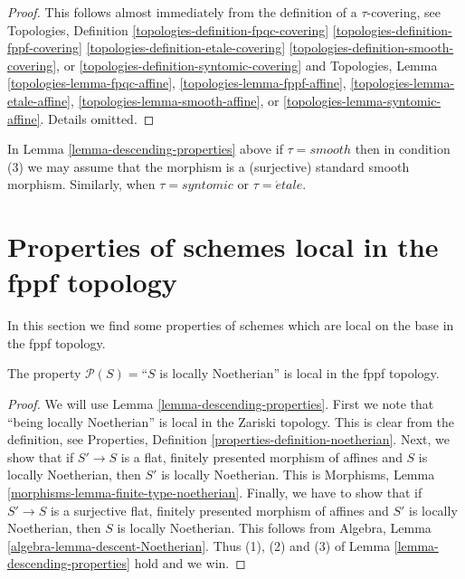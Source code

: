 \begin{proof}
This follows almost immediately from the definition of
a $\tau$-covering, see
Topologies, Definition
\ref{topologies-definition-fpqc-covering}
\ref{topologies-definition-fppf-covering}
\ref{topologies-definition-etale-covering}
\ref{topologies-definition-smooth-covering}, or
\ref{topologies-definition-syntomic-covering}
and Topologies, Lemma
\ref{topologies-lemma-fpqc-affine},
\ref{topologies-lemma-fppf-affine},
\ref{topologies-lemma-etale-affine},
\ref{topologies-lemma-smooth-affine}, or
\ref{topologies-lemma-syntomic-affine}.
Details omitted.
\end{proof}

\begin{remark}
\label{remark-descending-properties-standard}
In Lemma \ref{lemma-descending-properties} above if
$\tau = smooth$ then in condition (3) we may assume that
the morphism is a (surjective) standard smooth morphism.
Similarly, when $\tau = syntomic$ or $\tau = \acute{e}tale$.
\end{remark}





\section{Properties of schemes local in the fppf topology}
\label{section-descending-properties-fppf}

\noindent
In this section we find some properties of schemes which are local on the base
in the fppf topology.

\begin{lemma}
\label{lemma-Noetherian-local-fppf}
The property $\mathcal{P}(S) =$``$S$ is locally Noetherian'' is local
in the fppf topology.
\end{lemma}

\begin{proof}
We will use Lemma \ref{lemma-descending-properties}.
First we note that ``being locally Noetherian'' is local
in the Zariski topology. This is clear from the definition,
see Properties, Definition \ref{properties-definition-noetherian}.
Next, we show that if $S' \to S$ is a flat, finitely presented
morphism of affines and $S$ is locally Noetherian, then $S'$ is
locally Noetherian. This is
Morphisms, Lemma \ref{morphisms-lemma-finite-type-noetherian}.
Finally, we have to show that if $S' \to S$ is a surjective
flat, finitely presented morphism of affines and $S'$ is
locally Noetherian, then $S$ is locally Noetherian. This follows from
Algebra, Lemma \ref{algebra-lemma-descent-Noetherian}.
Thus (1), (2) and (3) of Lemma \ref{lemma-descending-properties} hold
and we win.
\end{proof}

